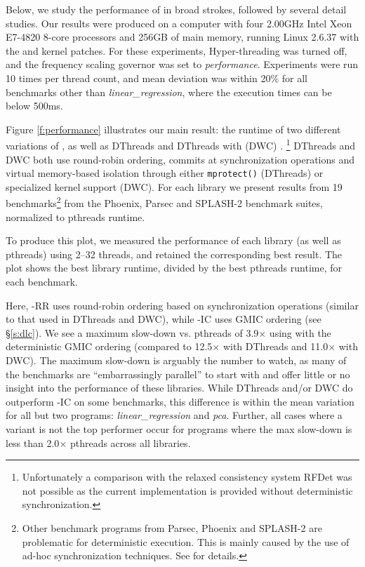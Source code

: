 Below, we study the performance of \lib{} in broad strokes, followed by several detail studies. Our results were produced on a computer with four 2.00GHz Intel Xeon E7-4820 8-core processors and 256GB of main memory, running Linux 2.6.37 with the \conversion{} and \lib{} kernel patches. For these experiments, Hyper-threading was turned off, and the frequency scaling governor was set to \emph{performance}. Experiments were run 10 times per thread count, and mean deviation was within 20\% for all benchmarks other than {\it linear\_regression}, where the execution times can be below 500ms.

Figure \ref{f:performance} illustrates our main result: the runtime of two different variations of \lib{}, as well as DThreads \cite{liu_dthreads:_2011} and DThreads with \conversion{} (DWC) \cite{merrifield_conversion:_2013}. \footnote{Unfortunately a comparison with the relaxed consistency system RFDet \cite{kai_lu_efficient_2014} was not possible as the current implementation is provided without deterministic synchronization.} DThreads and DWC both use round-robin ordering, commits at synchronization operations and virtual memory-based isolation through either {\tt mprotect()} (DThreads) or specialized kernel support (DWC). For each library we present results from 19 benchmarks\footnote{Other benchmark programs from Parsec, Phoenix and SPLASH-2 are problematic for deterministic execution. This is mainly caused by the use of ad-hoc synchronization techniques. See \cite{liu_dthreads:_2011} for details.} from the Phoenix, Parsec and SPLASH-2 benchmark suites, normalized to pthreads runtime. 

To produce this plot, we measured the performance of each library (as well as pthreads) using 2--32 threads, and retained the corresponding best result. The plot shows the best library runtime, divided by the best pthreads runtime, for each benchmark. 

Here, \lib{}-RR uses round-robin ordering based on synchronization operations (similar to that used in DThreads and DWC), while \lib{}-IC uses GMIC ordering (see \S\ref{s:dlc}). We see a maximum slow-down vs. pthreads of 3.9$\times$ using \lib{} with the deterministic GMIC ordering (compared to 12.5$\times$ with DThreads and 11.0$\times$ with DWC). The maximum slow-down is arguably the number to watch, as many of the benchmarks are ``embarrassingly parallel'' to start with and offer little or no insight into the performance of these libraries. While DThreads and/or DWC do outperform \lib{}-IC on some benchmarks, this difference is within the mean variation for all but two programs: {\it linear\_regression} and {\it pca}. Further, all cases where a \lib{} variant is not the top performer occur for programs where the max slow-down is less than 2.0$\times$ pthreads across all libraries. 

